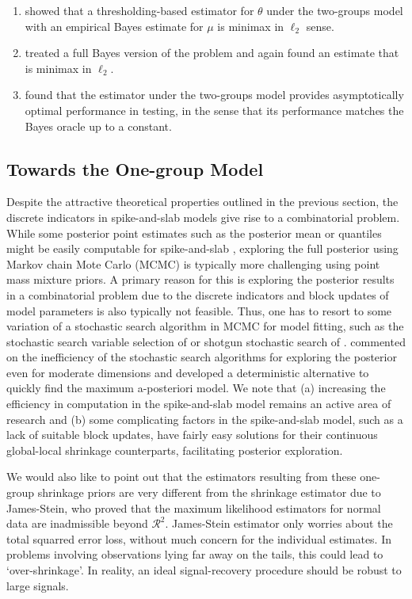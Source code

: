 \documentclass[11pt]{article}
\numberwithin{equation}{section}
\begin{document}
\begin{enumerate}
\item \cite{johnstone2004needles} showed that a thresholding-based estimator for $\theta$ under the two-groups model with an empirical Bayes estimate for $\mu$ is minimax in $\ell_2$ sense.
\item \cite{castillo2012needles} treated a full Bayes version of the problem and again found an estimate that is minimax in $\ell_2$.
\item \cite{bogdan2011asymptotic} found that the estimator under the two-groups model provides asymptotically optimal performance in testing, in the sense that its performance matches the Bayes oracle up to a constant.
\end{enumerate}

\subsection{Towards the One-group Model}

Despite the attractive theoretical properties outlined in the previous section, the discrete indicators in spike-and-slab models give rise to a combinatorial problem. While some posterior point estimates such as the posterior mean or quantiles might be easily computable for spike-and-slab \citep{castillo2012needles, castillo2015}, exploring the full posterior using Markov chain Mote Carlo (MCMC) is typically more challenging using point mass mixture priors. A primary reason for this is exploring the posterior results in a combinatorial problem due to the discrete indicators and block updates of model parameters is also typically not feasible. Thus, one has to resort to some variation of a stochastic search algorithm in MCMC for model fitting, such as the stochastic search variable selection of \citet{george93, george97} or shotgun stochastic search of \citet{hans2007}. \citet{rockova2014} commented on the inefficiency of the stochastic search algorithms for exploring the posterior even for moderate dimensions and developed a deterministic alternative to quickly find the maximum a-posteriori model. We note that (a) increasing the efficiency in computation in the spike-and-slab model remains an active area of research \citep[see, e.g., ][]{rockova2014} and (b) some complicating factors in the spike-and-slab model, such as a lack of suitable block updates, have fairly easy solutions for their continuous global-local shrinkage counterparts, facilitating posterior exploration. 

We would also like to point out that the estimators resulting from these one-group shrinkage priors are very different from the shrinkage estimator due to James-Stein, who proved that the maximum likelihood estimators for normal data are inadmissible beyond $\mathcal{R}^2$. James-Stein estimator only worries about the total squarred error loss, without much concern for the individual estimates. In problems involving observations lying far away on the tails, this could lead to `over-shrinkage'. In reality, an ideal signal-recovery procedure should be robust to large signals.
\end{document}
